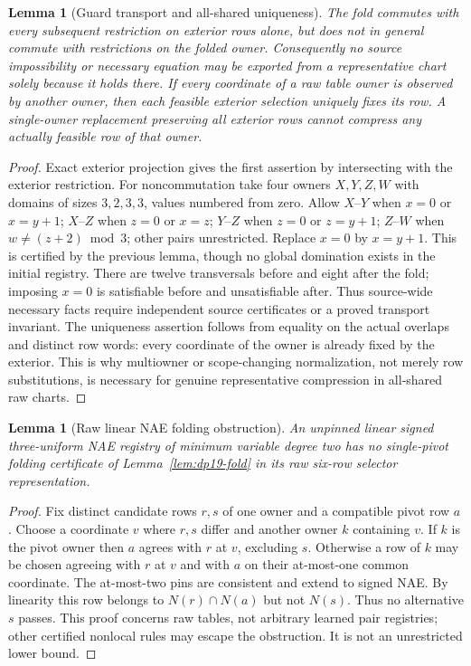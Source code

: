 \documentclass[11pt]{article}
\newtheorem{lemma}[theorem]{Lemma}
\begin{document}
\begin{lemma}[Guard transport and all-shared uniqueness]\label{lem:dp19-firewall}
The fold commutes with every subsequent restriction on exterior rows alone, but does not in general commute with restrictions on the folded owner. Consequently no source impossibility or necessary equation may be exported from a representative chart solely because it holds there. If every coordinate of a raw table owner is observed by another owner, then each feasible exterior selection uniquely fixes its row. A single-owner replacement preserving all exterior rows cannot compress any actually feasible row of that owner.
\end{lemma}
\begin{proof}
Exact exterior projection gives the first assertion by intersecting with the exterior restriction. For noncommutation take four owners $X,Y,Z,W$ with domains of sizes $3,2,3,3$, values numbered from zero. Allow $X$--$Y$ when $x=0$ or $x=y+1$; $X$--$Z$ when $z=0$ or $x=z$; $Y$--$Z$ when $z=0$ or $z=y+1$; $Z$--$W$ when $w\ne(z+2)\bmod 3$; other pairs unrestricted. Replace $x=0$ by $x=y+1$. This is certified by the previous lemma, though no global domination exists in the initial registry. There are twelve transversals before and eight after the fold; imposing $x=0$ is satisfiable before and unsatisfiable after. Thus source-wide necessary facts require independent source certificates or a proved transport invariant. The uniqueness assertion follows from equality on the actual overlaps and distinct row words: every coordinate of the owner is already fixed by the exterior. This is why multiowner or scope-changing normalization, not merely row substitutions, is necessary for genuine representative compression in all-shared raw charts.
\end{proof}
\begin{lemma}[Raw linear NAE folding obstruction]\label{lem:dp19-stall}
An unpinned linear signed three-uniform NAE registry of minimum variable degree two has no single-pivot folding certificate of Lemma~\ref{lem:dp19-fold} in its raw six-row selector representation.
\end{lemma}
\begin{proof}
Fix distinct candidate rows $r,s$ of one owner and a compatible pivot row $a$. Choose a coordinate $v$ where $r,s$ differ and another owner $k$ containing $v$. If $k$ is the pivot owner then $a$ agrees with $r$ at $v$, excluding $s$. Otherwise a row of $k$ may be chosen agreeing with $r$ at $v$ and with $a$ on their at-most-one common coordinate. The at-most-two pins are consistent and extend to signed NAE. By linearity this row belongs to $N(r)\cap N(a)$ but not $N(s)$. Thus no alternative $s$ passes. This proof concerns raw tables, not arbitrary learned pair registries; other certified nonlocal rules may escape the obstruction. It is not an unrestricted lower bound.
\end{proof}
\end{document}
